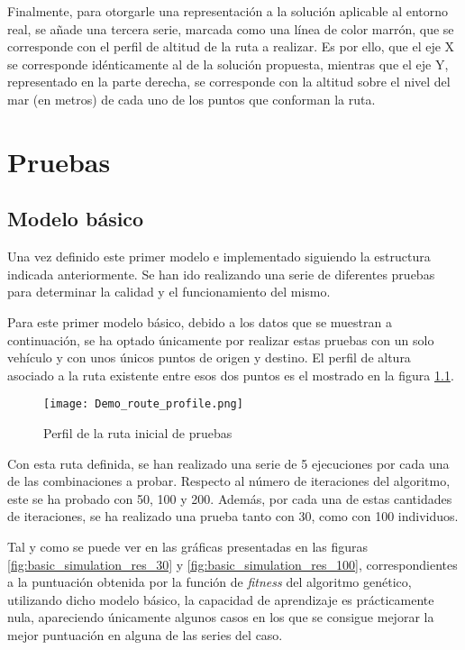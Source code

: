 \documentclass[11pt,spanish,listoffigures,listoftables]{tfgetsinf}
\begin{document}
Finalmente, para otorgarle una representación a la solución aplicable al entorno real, se añade una tercera serie, marcada como una línea de color marrón, que se corresponde con el perfil de altitud de la ruta a realizar. Es por ello, que el eje X se corresponde idénticamente al de la solución propuesta, mientras que el eje Y, representado en la parte derecha, se corresponde con la altitud sobre el nivel del mar (en metros) de cada uno de los puntos que conforman la ruta.

\chapter{Pruebas}
\section{Modelo básico}
Una vez definido este primer modelo e implementado siguiendo la estructura indicada anteriormente. Se han ido realizando una serie de diferentes pruebas para determinar la calidad y el funcionamiento del mismo.

Para este primer modelo básico, debido a los datos que se muestran a continuación, se ha optado únicamente por realizar estas pruebas con un solo vehículo y con unos únicos puntos de origen y destino. El perfil de altura asociado a la ruta existente entre esos dos puntos es el mostrado en la figura \ref{fig:test_profile}.

\begin{figure}[ht]
    \centering
    \texttt{[image: Demo\_route\_profile.png]}
    \caption{Perfil de la ruta inicial de pruebas}
    \label{fig:test_profile}
\end{figure}

Con esta ruta definida, se han realizado una serie de 5 ejecuciones por cada una de las combinaciones a probar. Respecto al número de iteraciones del algoritmo, este se ha probado con 50, 100 y 200. Además, por cada una de estas cantidades de iteraciones, se ha realizado una prueba tanto con 30, como con 100 individuos.

Tal y como se puede ver en las gráficas presentadas en las figuras \ref{fig:basic_simulation_res_30} y \ref{fig:basic_simulation_res_100}, correspondientes a la puntuación obtenida por la función de \textit{fitness} del algoritmo genético, utilizando dicho modelo básico, la capacidad de aprendizaje es prácticamente nula, apareciendo únicamente algunos casos en los que se consigue mejorar la mejor puntuación en alguna de las series del caso.
\end{document}
